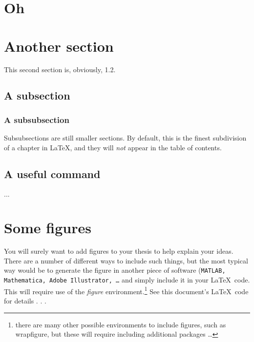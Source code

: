 \section{Oh}

\section{Another section}

This second section is, obviously, 1.2.

\subsection{A subsection}

\subsubsection{A subsubsection}

Subsubsections are still smaller sections.  By default, this is the finest subdivision of a chapter in \LaTeX, and they will \emph{not} appear in the table of contents.  

\subsection{A useful command}
...

\section{Some figures}

You will surely want to add figures to your thesis to help explain your ideas.  There are a number of different ways to include such things, but the most typical way would be to generate the figure in another piece of software (\texttt{MATLAB, Mathematica, Adobe Illustrator, \ldots} and simply include it in your \LaTeX ~code.  This will require use of the \emph{figure} environment.\footnote{there are many other possible environments to include figures, such as wrapfigure, but these will require including additional packages \ldots}  See this document's \LaTeX ~code for details . . .

